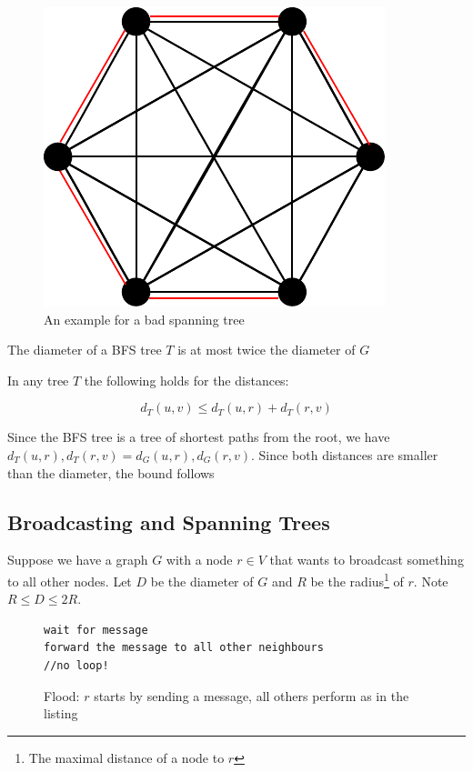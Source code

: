 \begin{figure}
\begin{center}
\includegraphics{./images/diameter_ratio_spanning_tree}
\end{center}
\caption{An example for a bad spanning tree}
\label{fig:diameter_ratio_spanning_tree}
\end{figure}

\begin{lem} The diameter of a BFS tree $T$ is at most twice the diameter of $G$\end{lem}
\begin{pr} In any tree $T$ the following holds for the distances:

\[d_T(u,v) \leq d_T(u,r) + d_T(r,v)\]

Since the BFS tree is a tree of shortest paths from the root, we have $d_T(u,r), d_T(r,v) = d_G(u,r), d_G(r,v)$. Since both distances are smaller than the diameter, the bound follows\end{pr} 

\subsection{Broadcasting and Spanning Trees}

Suppose we have a graph $G$ with a node $r\in V$ that wants to broadcast something to all other nodes. Let $D$ be the diameter of $G$ and $R$ be the radius\footnote{The maximal distance of a node to $r$} of $r$. Note $R\leq D\leq 2R$.

\begin{figure}
\begin{lstlisting}
wait for message
forward the message to all other neighbours 
//no loop!
\end{lstlisting}
\caption{Flood: $r$ starts by sending a message, all others perform as in the listing}
\label{alg:flood}
\end{figure}

